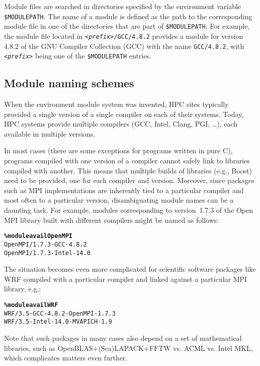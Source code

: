 Module files are searched in directories specified by the
environment variable \texttt{\small \$MODULEPATH}. The name of a module is defined
as the path to the corresponding module file in one of the directories that are
part of \texttt{\small \$MODULEPATH}. For example, the module file located in
\texttt{\small \emph{<prefix>}/GCC/4.8.2}
provides a module for version 4.8.2 of the GNU Compiler Collection (GCC) with the
name \texttt{\small GCC/4.8.2}, with \texttt{\small\emph{<prefix>}} being one of the
\texttt{\small \$MODULEPATH} entries.

\subsection{Module naming schemes}
\label{sec:Module_naming_scheme}
When the environment module system was invented, HPC sites typically provided
a single version of a single compiler on each of their systems.
Today, HPC systems provide multiple compilers (GCC, Intel,
Clang, PGI, \ldots), each available in multiple versions.

In most cases (there are some exceptions for programs written in pure C), programs
compiled with one version of a compiler cannot safely link to libraries compiled
with another. This means that multiple builds of libraries (e.g., Boost) need to be
provided, one for each compiler and version.
Moreover, since packages such as MPI implementations are inherently tied to a
particular compiler and most often to a particular version, disambiguating
module names can be a daunting task. For example, modules corresponding to
version~1.7.3 of the Open\,MPI library built with different compilers might be named
as follows:
{\small
\begin{alltt}
    \textbf{\% module avail OpenMPI}
    OpenMPI/1.7.3-GCC-4.8.2
    OpenMPI/1.7.3-Intel-14.0\
\end{alltt}
}

The situation becomes even more complicated for scientific software
packages like WRF compiled with a particular compiler and linked
against a particular MPI library, e.g.:
{\small
\begin{alltt}
    \textbf{\% module avail WRF}
    WRF/3.5-GCC-4.8.2-OpenMPI-1.7.3
    WRF/3.5-Intel-14.0-MVAPICH-1.9\
\end{alltt}
}
\noindent
Note that such packages in many cases also depend on a set of mathematical
libraries, such as OpenBLAS+(Sca)LAPACK+FFTW vs. ACML vs. Intel MKL, which complicates matters even further.

